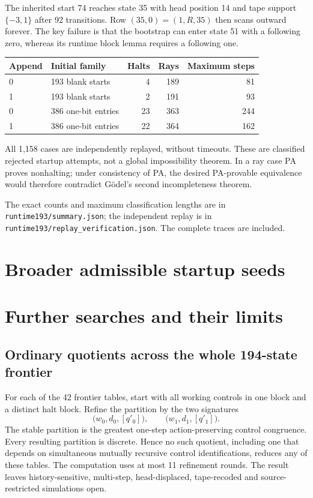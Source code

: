 \documentclass[11pt,letterpaper]{article}
\newcommand{\file}[1]{\texttt{\nolinkurl{#1}}}
\begin{document}
The inherited start 74 reaches state 35 with head position 14 and tape
support $\{-3,1\}$ after 92 transitions. Row $(35,0)=(1,R,35)$ then scans
outward forever. The key failure is that the bootstrap can enter state 51
with a following zero, whereas its runtime block lemma requires a following one.

\begin{center}\small
\begin{tabular}{@{}llrrr@{}}
\toprule Append & Initial family & Halts & Rays & Maximum steps\\\midrule
0 & 193 blank starts & 4 & 189 & 81\\
1 & 193 blank starts & 2 & 191 & 93\\
0 & 386 one-bit entries & 23 & 363 & 244\\
1 & 386 one-bit entries & 22 & 364 & 162\\
\bottomrule
\end{tabular}
\end{center}
All 1,158 cases are independently replayed, without timeouts. These are
classified rejected startup attempts, not a global impossibility theorem.
In a ray case PA proves nonhalting; under consistency of PA, the desired
PA-provable equivalence would therefore contradict G\"odel's second
incompleteness theorem.

The exact counts and maximum classification lengths are in
\file{runtime193/summary.json}; the independent replay is in
\file{runtime193/replay_verification.json}. The complete traces are included.

\section{Broader admissible startup seeds}\label{sec:seeds}


\section{Further searches and their limits}
\label{sec:search}

\subsection{Ordinary quotients across the whole 194-state frontier}

For each of the 42 frontier tables, start with all working controls in one
block and a distinct halt block. Refine the partition by the two signatures
\[
 \bigl(w_0,d_0,[q'_0]\bigr),\qquad
 \bigl(w_1,d_1,[q'_1]\bigr).
\]
The stable partition is the greatest one-step action-preserving control
congruence. Every resulting partition is discrete. Hence no such quotient,
including one that depends on simultaneous mutually recursive control
identifications, reduces any of these tables. The computation uses at most
11 refinement rounds. The result leaves history-sensitive, multi-step,
head-displaced, tape-recoded and source-restricted simulations open.
\end{document}
